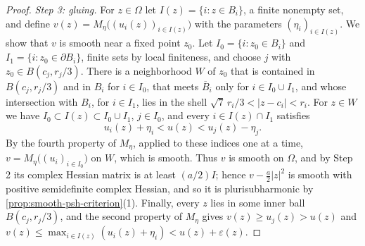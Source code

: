 \begin{proof}
\emph{Step 3: gluing.} For $z\in\Omega$ let $I(z)=\{i:z\in B_i\}$, a finite nonempty set, and define $v(z)=M_\eta\bigl((u_i(z))_{i\in I(z)}\bigr)$ with the parameters $(\eta_i)_{i\in I(z)}$. We show that $v$ is smooth near a fixed point $z_0$. Let $I_0=\{i:z_0\in B_i\}$ and $I_1=\{i:z_0\in\partial B_i\}$, finite sets by local finiteness, and choose $j$ with $z_0\in B(c_j,r_j/3)$. There is a neighborhood $W$ of $z_0$ that is contained in $B(c_j,r_j/3)$ and in $B_i$ for $i\in I_0$, that meets $\overline B_i$ only for $i\in I_0\cup I_1$, and whose intersection with $B_i$, for $i\in I_1$, lies in the shell $\sqrt7\,r_i/3<|z-c_i|<r_i$. For $z\in W$ we have $I_0\subset I(z)\subset I_0\cup I_1$, $j\in I_0$, and every $i\in I(z)\cap I_1$ satisfies
\[
 u_i(z)+\eta_i<u(z)<u_j(z)-\eta_j.
\]
By the fourth property of $M_\eta$, applied to these indices one at a time, $v=M_\eta\bigl((u_i)_{i\in I_0}\bigr)$ on $W$, which is smooth. Thus $v$ is smooth on $\Omega$, and by Step 2 its complex Hessian matrix is at least $(a/2)I$; hence $v-\tfrac a2|z|^2$ is smooth with positive semidefinite complex Hessian, and so it is plurisubharmonic by \cref{prop:smooth-psh-criterion}(1). Finally, every $z$ lies in some inner ball $B(c_j,r_j/3)$, and the second property of $M_\eta$ gives $v(z)\ge u_j(z)>u(z)$ and $v(z)\le\max_{i\in I(z)}(u_i(z)+\eta_i)<u(z)+\varepsilon(z)$.
\end{proof}

